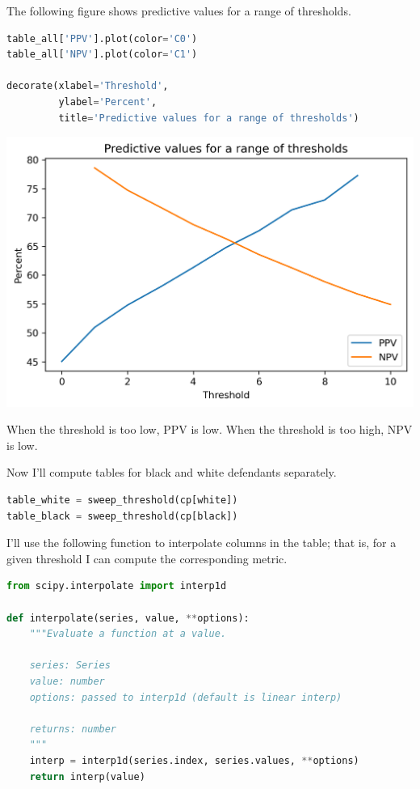 The following figure shows predictive values for a range of thresholds.

\begin{lstlisting}[language=Python,style=source]
table_all['PPV'].plot(color='C0')
table_all['NPV'].plot(color='C1')

decorate(xlabel='Threshold', 
         ylabel='Percent',
         title='Predictive values for a range of thresholds')
\end{lstlisting}

\begin{center}
\includegraphics[scale=0.75]{02_calibration_files/02_calibration_39_0.png}
\end{center}

When the threshold is too low, PPV is low. When the threshold is too
high, NPV is low.

Now I'll compute tables for black and white defendants separately.

\begin{lstlisting}[language=Python,style=source]
table_white = sweep_threshold(cp[white])
table_black = sweep_threshold(cp[black])
\end{lstlisting}

I'll use the following function to interpolate columns in the table;
that is, for a given threshold I can compute the corresponding metric.

\begin{lstlisting}[language=Python,style=source]
from scipy.interpolate import interp1d

def interpolate(series, value, **options):
    """Evaluate a function at a value.
    
    series: Series
    value: number
    options: passed to interp1d (default is linear interp)
    
    returns: number
    """
    interp = interp1d(series.index, series.values, **options)
    return interp(value)
\end{lstlisting}

